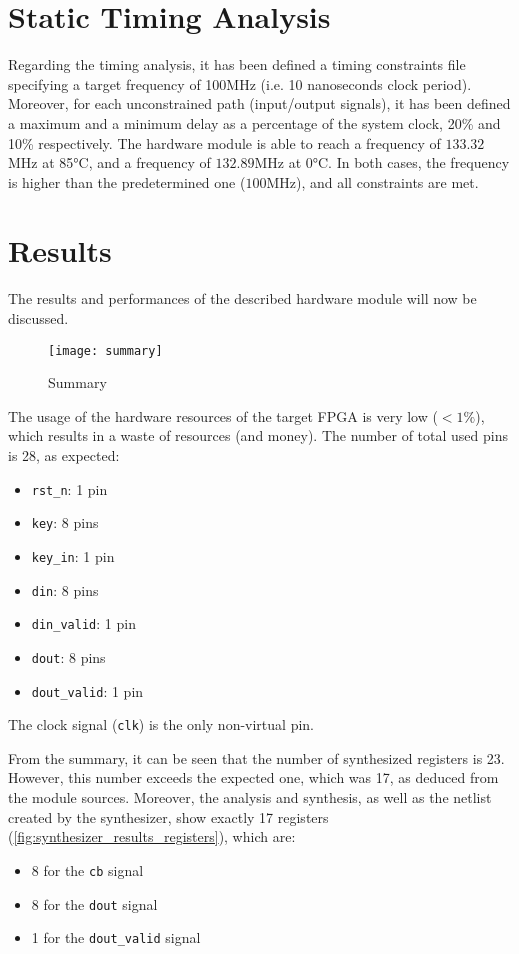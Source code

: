\section{Static Timing Analysis}
Regarding the timing analysis, it has been defined a timing constraints file specifying a
target frequency of 100MHz (i.e. 10 nanoseconds clock period). Moreover, for each unconstrained path (input/output signals), it has been defined a maximum and a minimum delay as a percentage of the system clock, 20\% and 10\% respectively. The hardware module is able to reach a frequency of $133.32$MHz at 85°C, and a frequency of $132.89$MHz at 0°C. In both cases, the frequency is higher than the predetermined one ($100$MHz), and all constraints are met.

\section{Results}
The results and performances of the described hardware module will now be discussed.
\begin{figure}[!ht]
    \centering
    \texttt{[image: summary]}
    \caption{Summary}
    \label{fig:summary}
\end{figure}

The usage of the hardware resources of the target FPGA is very low ($< 1\%$), which results in a waste of resources (and money). The number of total used pins is 28, as expected:
\begin{multicols}{3}
    \begin{itemize}
        \item \lstinline{rst_n}: 1 pin
        \item \lstinline{key}: 8 pins
        \item \lstinline{key_in}: 1 pin
        \item \lstinline{din}: 8 pins
        \item \lstinline{din_valid}: 1 pin
        \item \lstinline{dout}: 8 pins
        \item \lstinline{dout_valid}: 1 pin
    \end{itemize}
\end{multicols}
The clock signal (\lstinline{clk}) is the only non-virtual pin.

\clearpage
From the summary, it can be seen that the number of synthesized registers is 23. However, this number exceeds the expected one, which was 17, as deduced from the module sources. Moreover, the analysis and synthesis, as well as the netlist created by the synthesizer, show exactly 17 registers (\cref{fig:synthesizer_results_registers}), which are:
\begin{itemize}
    \item 8 for the \lstinline{cb} signal
    \item 8 for the \lstinline{dout} signal
    \item 1 for the \lstinline{dout_valid} signal
\end{itemize}

